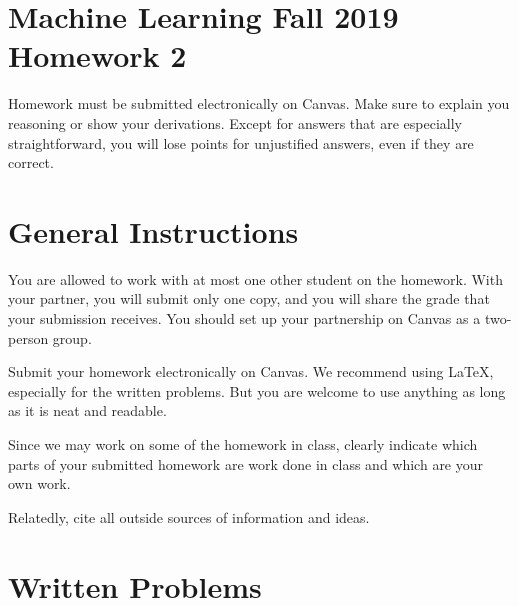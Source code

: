 \documentclass[10pt]{article}
\begin{document}
\section*{Machine Learning Fall 2019 Homework 2}

Homework must be submitted electronically on Canvas. Make sure to explain you reasoning or show your derivations. Except for answers that are especially straightforward, you will lose points for unjustified answers, even if they are correct. 

\section*{General Instructions}

You are allowed to work with at most one other student on the homework. With your partner, you will submit only one copy, and you will share the grade that your submission receives. You should set up your partnership on Canvas as a two-person group. 

Submit your homework electronically on Canvas. We recommend using LaTeX, especially for the written problems. But you are welcome to use anything as long as it is neat and readable. 

Since we may work on some of the homework in class, clearly indicate which parts of your submitted homework are work done in class and which are your own work. 

Relatedly, cite all outside sources of information and ideas. 

\section*{Written Problems}
\end{document}
